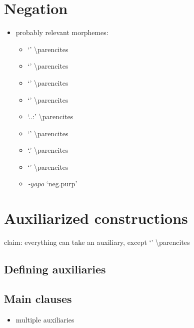 \documentclass{memoir}
\begin{document}
\chapter{\texorpdfstring{Negation \label{negation}}{Negation }}

\begin{itemize}
\tightlist
\item
  probably relevant morphemes:

  \begin{itemize}
  \tightlist
  \item
     `' \textbackslash parencites
  \item
     `' \textbackslash parencites
  \item
     `' \textbackslash parencites
  \item
     `' \textbackslash parencites
  \item
     `..:'
    \textbackslash parencites
  \item
     `' \textbackslash parencites
  \item
     `.' \textbackslash parencites
  \item
     `' \textbackslash parencites
  \item
    \emph{‑yapo} `neg.purp'
  \end{itemize}
\end{itemize}

\chapter{Auxiliarized constructions}

claim: everything can take an auxiliary, except  `'
\textbackslash parencites

\section{Defining auxiliaries}

\section{Main clauses}

\begin{itemize}
\tightlist
\item
  multiple auxiliaries
\end{itemize}
\end{document}
